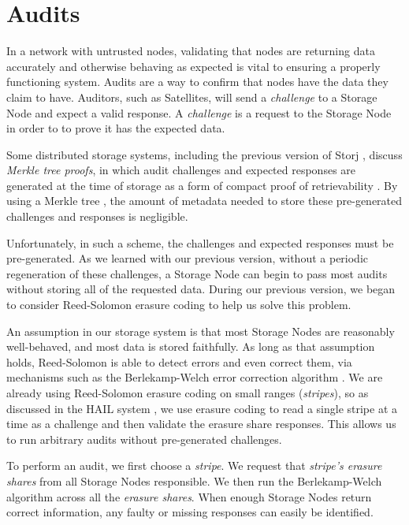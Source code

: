 \documentclass[8pt,fleqn,openany]{book}
\begin{document}
\section{Audits}\label{sec:concrete-audits}

In a network with untrusted nodes, validating that nodes are returning data
accurately and otherwise behaving as expected is vital to ensuring a properly
functioning system. Audits are a way to confirm that nodes have the data they
claim to have. Auditors, such as Satellites, will send a {\em challenge} to a
Storage Node and expect a valid response. A {\em challenge} is a request to the
Storage Node in order to to prove it has the expected data.

Some distributed storage systems, including the previous version of Storj
\cite{storj-v2}, discuss {\em Merkle tree proofs}, in which audit challenges
and expected responses are generated at the time of storage as a form of compact
proof of retrievability \cite{juels}. By using a Merkle tree
\cite{merkle-tree}, the amount of metadata needed to store these pre-generated
challenges and responses is negligible.

Unfortunately, in such a scheme, the challenges and expected responses must be
pre-generated. As we learned with our previous version, without a periodic
regeneration of these challenges, a Storage Node can begin to pass most
audits without storing all of the requested data. During our previous version,
we began to consider Reed-Solomon erasure coding to help us solve this problem.

An assumption in our storage system is that most Storage Nodes are
reasonably well-behaved, and most data is stored faithfully. As long as that
assumption holds, Reed-Solomon is able to detect errors and even correct them,
via mechanisms such as the Berlekamp-Welch error correction algorithm
\cite{bw, rs-intro}.
We are already using Reed-Solomon erasure coding \cite{rs} on small ranges
({\em stripes}), so as discussed in the HAIL system \cite{hail},
we use erasure coding to read a single stripe at a time as a challenge
and then validate the erasure share responses. This allows us to run arbitrary
audits without pre-generated challenges.

To perform an audit, we first choose a {\em stripe}. We request that
{\em stripe's erasure shares} from all Storage Nodes responsible. We then run
the Berlekamp-Welch algorithm \cite{bw, rs-intro} across all the
{\em erasure shares}. When enough Storage Nodes return correct information,
any faulty or missing responses can easily be identified.
\end{document}

